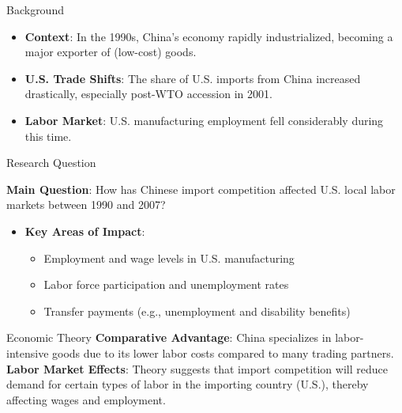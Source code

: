 \documentclass{beamer}
\begin{document}
\begin{frame}{Background}
    \begin{itemize}
        \item \textbf{Context}: In the 1990s, China's economy rapidly industrialized, becoming a major exporter of (low-cost) goods.
        \item \textbf{U.S. Trade Shifts}: The share of U.S. imports from China increased drastically, especially post-WTO accession in 2001.
        \item \textbf{Labor Market}: U.S. manufacturing employment fell considerably during this time.
    \end{itemize}
\end{frame}

\begin{frame}{Research Question}
\begin{tcolorbox}
    \textbf{Main Question}: How has Chinese import competition affected U.S. local labor markets between 1990 and 2007?
\end{tcolorbox}
    \begin{itemize}
        \item \textbf{Key Areas of Impact}: 
        \begin{itemize}
            \item Employment and wage levels in U.S. manufacturing
            \item Labor force participation and unemployment rates
            \item Transfer payments (e.g., unemployment and disability benefits)
        \end{itemize}
    \end{itemize}
\end{frame}

\begin{frame}{Economic Theory}
    \textbf{Comparative Advantage}: China specializes in labor-intensive goods due to its lower labor costs compared to many trading partners. \\
   \textbf{Labor Market Effects}: Theory suggests that import competition will reduce demand for certain types of labor in the importing country (U.S.), thereby affecting wages and employment.
\end{frame}
\end{document}

